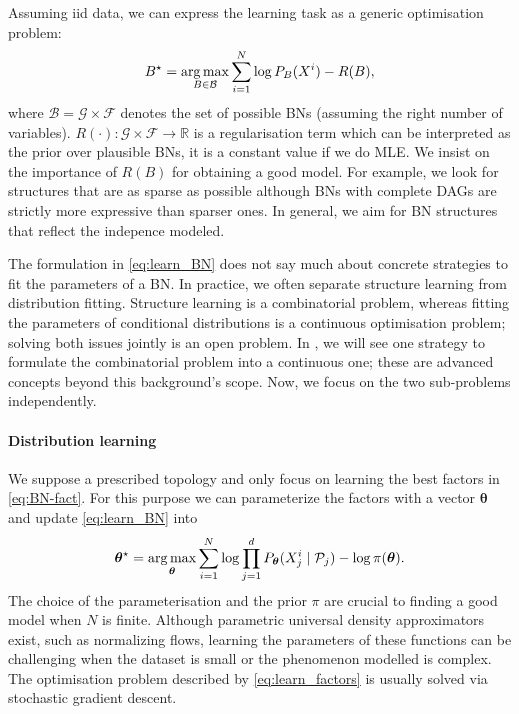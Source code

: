 Assuming iid data, we can express the learning task as a generic optimisation problem:
\begin{align}
  B^\star  = \operatorname*{arg\,max}_{B\in\mathcal{B}} \sum_{i=1}^N \log P_B(X^i) - R(B), \label{eq:learn_BN}
\end{align}
where $\mathcal{B} = \mathcal{G} \times \mathcal{F}$ denotes the set of possible BNs (assuming the right number of variables). $R(\cdot): \mathcal{G} \times \mathcal{F} \rightarrow \mathbb{R}$ is a regularisation term which can be interpreted as the prior over plausible BNs, it is a constant value if we do MLE. We insist on the importance of $R(B)$ for obtaining a good model. For example, we look for structures that are as sparse as possible although BNs with complete DAGs are strictly more expressive than sparser ones. In general, we aim for BN structures that reflect the indepence modeled.

The formulation in \ref{eq:learn_BN} does not say much about concrete strategies to fit the parameters of a BN. In practice, we often separate structure learning from distribution fitting. Structure learning is a combinatorial problem, whereas fitting the parameters of conditional distributions is a continuous optimisation problem; solving both issues jointly is an open problem. In , we will see one strategy to formulate the combinatorial problem into a continuous one; these are advanced concepts beyond this background's scope. Now, we focus on the two sub-problems independently.

\paragraph{Distribution learning}
We suppose a prescribed topology and only focus on learning the best factors in \eqref{eq:BN-fact}. For this purpose we can parameterize the factors with a vector $\bm \theta$ and update \eqref{eq:learn_BN} into
\begin{align}
  {\bm \theta}^\star  = \operatorname*{arg\,max}_{\bm \theta} \sum_{i=1}^N \log \prod^d_{j=1}P_{\bm \theta}(X_j^i\mid \mathcal{P}_j) - \log \pi(\bm \theta).
 \label{eq:learn_factors}
\end{align}
The choice of the parameterisation and the prior $\pi$ are crucial to finding a good model when $N$ is finite. Although parametric universal density approximators exist, such as normalizing flows, learning the parameters of these functions can be challenging when the dataset is small or the phenomenon modelled is complex. The optimisation problem described by \eqref{eq:learn_factors} is usually solved via stochastic gradient descent.

